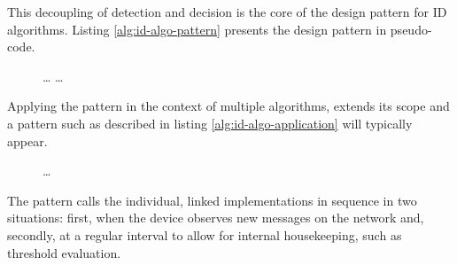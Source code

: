 \documentclass[conference]{IEEEtran}
\begin{document}
This decoupling of detection and decision is the core of the design pattern for
ID algorithms. Listing \ref{alg:id-algo-pattern} presents the design pattern in
pseudo-code.

\begin{figure}[ht]
\begin{algorithmic}[1]
     \label{alg:id-algo-pattern-loop1}
     \State \dots {}
    \EndFor
      
    \State {}  \label{alg:id-algo-pattern-send1}
  \EndFunction
  \State
     \label{alg:id-algo-pattern-loop2} \label{alg:id-algo-pattern-common-data}
       
        \State \dots {}
        \State {}  \label{alg:id-algo-pattern-send2}
      \EndIf
    \EndFor
  \EndFunction
  \State
\end{algorithmic}
\end{figure}

Applying the pattern in the context of multiple algorithms, extends its scope
and a pattern such as described in listing \ref{alg:id-algo-application} will
typically appear.

\begin{figure}[ht]
\begin{algorithmic}[1]
   
    \State {}
  \EndFor
  \State \dots
    \State {}
  \EndFor
\end{algorithmic}
\end{figure}

The pattern calls the individual, linked implementations in sequence in two
situations: first, when the device observes new messages on the network and,
secondly, at a regular interval to allow for internal housekeeping, such as
threshold evaluation.
\end{document}
